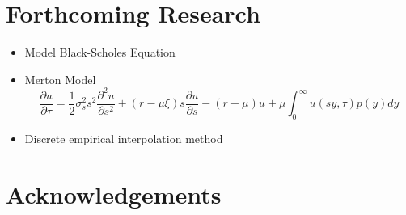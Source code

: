 \documentclass{a0poster}
\begin{document}
\begin{multicols}{3}



\color{DarkSlateGray} %

\vspace{-1.5cm}
\section{Forthcoming Research}

\begin{itemize}
	\item Model Black-Scholes Equation
	\item Merton Model
	$$\frac{\partial u}{\partial \tau} = \frac{1}{2} \sigma^2_s s^2 \frac{\partial^2 u}{\partial s^2} + (r-\mu \xi) s \frac{\partial u}{\partial s} - (r+\mu)u + \mu \int_{0}^{\infty}u (sy,\tau)p(y)dy$$
	\item Discrete empirical interpolation method
\end{itemize}
\large
\nocite{*} %


\section{Acknowledgements}


\end{multicols}
\end{document}
